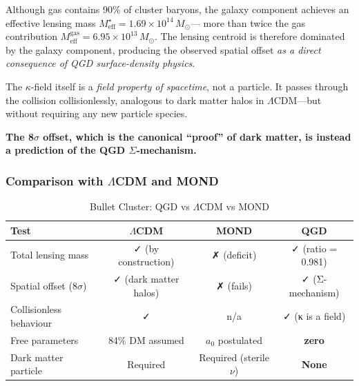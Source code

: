 Although gas contains 90\% of cluster baryons, the galaxy component
achieves an effective lensing mass $M_\text{eff}^\star = 1.69\times10^{14}\,M_\odot$—
more than twice the gas contribution $M_\text{eff}^\text{gas} = 6.95\times10^{13}\,M_\odot$.
The lensing centroid is therefore dominated by the galaxy component,
producing the observed spatial offset \emph{as a direct consequence of
QGD surface-density physics}.

The $\kappa$-field itself is a \emph{field property of spacetime}, not a
particle. It passes through the collision collisionlessly, analogous to
dark matter halos in $\Lambda$CDM—but without requiring any new particle species.

\textbf{The 8$\sigma$ offset, which is the canonical ``proof'' of dark matter,
is instead a prediction of the QGD $\Sigma$-mechanism.}

\subsubsection{Comparison with $\Lambda$CDM and MOND}

\begin{table}[ht]
	\centering
	\caption{Bullet Cluster: QGD vs $\Lambda$CDM vs MOND}
	\label{tab:bullet_comparison}
	\begin{tabular}{@{}lccc@{}}
		\toprule
		Test & $\Lambda$CDM & MOND & QGD \\
		\midrule
		Total lensing mass & ✓ (by construction) & ✗ (deficit) & ✓ (ratio = 0.981) \\
		Spatial offset (8$\sigma$) & ✓ (dark matter halos) & ✗ (fails) & ✓ (Σ-mechanism) \\
		Collisionless behaviour & ✓ & n/a & ✓ (κ is a field) \\
		Free parameters & 84\% DM assumed & $a_0$ postulated & \textbf{zero} \\
		Dark matter particle & Required & Required (sterile $\nu$) & \textbf{None} \\
		\bottomrule
	\end{tabular}
\end{table}

